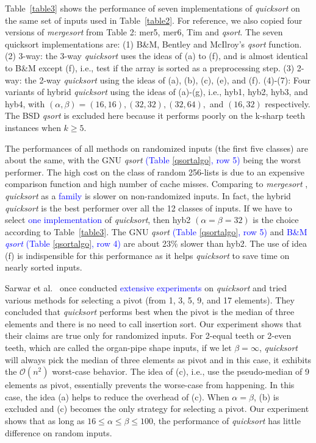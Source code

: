 \documentclass[AMA,STIX1COL]{WileyNJD-v2}
\newcommand{\qusort}{\emph{quicksort }}
\newcommand{\qusortn}{\emph{quicksort}}
\newcommand{\qsort}{\emph{qsort }}
\newcommand{\qsortn}{\emph{qsort}}
\newcommand{\msort}{\emph{mergesort }}
\begin{document}
Table~\ref{table3} shows the performance of seven implementations of \qusort on the same set of inputs used in Table~\ref{table2}. 
For reference, we also copied four versions of \msort from Table 2: mer5, mer6, Tim and \qsortn. 
The seven quicksort implementations are: (1) B\&M, Bentley and McIlroy’s \qsort function. (2) 3-way: the 3-way \qusort uses the ideas of (a) to (f), and is almost identical to B\&M except (f), i.e., test if the array is sorted as a preprocessing step. (3) 2-way: the 2-way \qusort using the ideas of (a), (b), (c), (e), and (f). (4)-(7): Four variants of hybrid \qusort using the ideas of (a)-(g), i.e., hyb1, hyb2, hyb3, and hyb4, with $(\alpha, \beta) = (16, 16), (32, 32), (32, 64),$ and $(16, 32)$ respectively. 
The BSD \qsort is excluded here because it performs poorly on the k-sharp teeth instances when $k \geq 5$.

The performances of all methods on randomized inputs (the first five classes) are about the same, with the GNU \qsort \textcolor{blue}{(Table \ref{qsortalgo}, row 5)} being the worst performer. 
The high cost on the class of random 256-lists is due to an expensive comparison function and high number of cache misses. 
Comparing to \msort, \qusort as a \textcolor{blue}{family} is slower on non-randomized inputs. 
In fact, the hybrid \qusort is the best performer over all the 12 classes of inputs. 
If we have to select \textcolor{blue}{one implementation} of \qusortn, then hyb2 $(\alpha = \beta = 32)$ is the choice according to Table~\ref{table3}. 
The GNU \qsort \textcolor{blue}{(Table \ref{qsortalgo}, row 5)} and \textcolor{blue}{B\&M \qsort (Table \ref{qsortalgo}, row 4)} are about 23\% slower than hyb2. 
The use of idea (f) is indispensible for this performance as it helps \qusort to save time on nearly sorted inputs. 

Sarwar et al.~\cite{sarwar1996engineering} once conducted \textcolor{blue}{extensive experiments} on \qusort and tried various methods for selecting a pivot (from 1, 3, 5, 9, and 17 elements). 
They concluded that \qusort performs best when the pivot is the median of three elements and there is no need to call insertion sort. 
Our experiment shows that their claims are true only for randomized inputs. 
For 2-equal teeth or 2-even teeth, which are called the organ-pipe shape inputs, if we let $\beta = \infty$, \qusort will always pick the median of three elements as pivot and in this case, it exhibits the $\mathcal{O}(n^2)$ worst-case behavior. 
The idea of (c), i.e., use the pseudo-median of 9 elements as pivot, essentially prevents the worse-case from happening. 
In this case, the idea (a) helps to reduce the overhead of (c). When $\alpha = \beta$, (b) is excluded and (c) becomes the only strategy for selecting a pivot. 
Our experiment shows that as long as $16 \leq \alpha \leq \beta \leq 100$, the performance of \qusort has little difference on random inputs.
\end{document}
